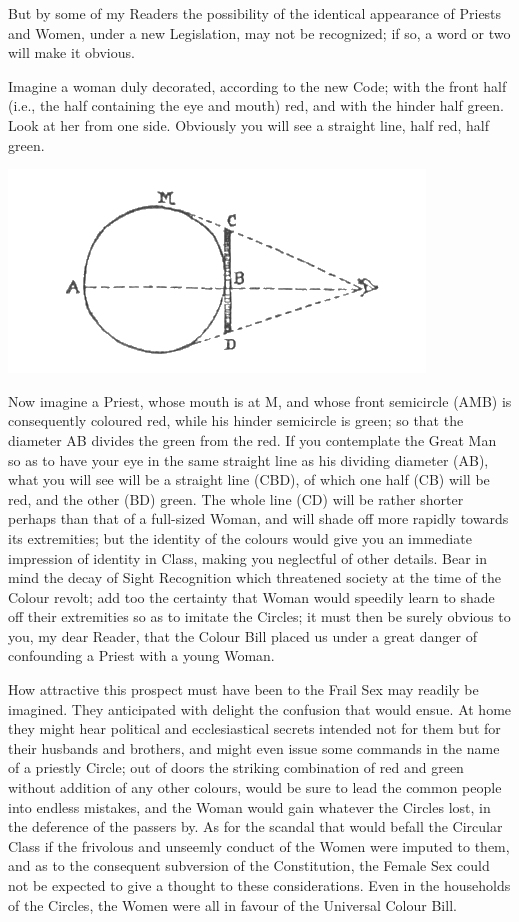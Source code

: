 \documentclass[12pt, a4paper, oneside]{memoir}
\begin{document}
But by some of my Readers the possibility of the identical appearance of
Priests and Women, under a new Legislation, may not be recognized; if so, a
word or two will make it obvious.

Imagine a woman duly decorated, according to the new Code; with the front half
(i.e., the half containing the eye and mouth) red, and with the hinder half
green. Look at her from one side. Obviously you will see a straight line, half
red, half green. 
\begin{center}
\includegraphics[trim=20mm 0mm 0mm 0mm, scale=0.5]{fig5}
\end{center}

Now imagine a Priest, whose mouth is at M, and whose front semicircle (AMB) is
consequently coloured red, while his hinder semicircle is green; so that the
diameter AB divides the green from the red. If you contemplate the Great Man
so as to have your eye in the same straight line as his dividing diameter
(AB), what you will see will be a straight line (CBD), of which one half (CB)
will be red, and the other (BD) green. The whole line (CD) will be rather
shorter perhaps than that of a full-sized Woman, and will shade off more
rapidly towards its extremities; but the identity of the colours would give
you an immediate impression of identity in Class, making you neglectful of
other details. Bear in mind the decay of Sight Recognition which threatened
society at the time of the Colour revolt; add too the certainty that Woman
would speedily learn to shade off their extremities so as to imitate the
Circles; it must then be surely obvious to you, my dear Reader, that the
Colour Bill placed us under a great danger of confounding a Priest with a
young Woman.

How attractive this prospect must have been to the Frail Sex may readily be
imagined. They anticipated with delight the confusion that would ensue. At
home they might hear political and ecclesiastical secrets intended not for
them but for their husbands and brothers, and might even issue some commands
in the name of a priestly Circle; out of doors the striking combination of red
and green without addition of any other colours, would be sure to lead the
common people into endless mistakes, and the Woman would gain whatever the
Circles lost, in the deference of the passers by. As for the scandal that
would befall the Circular Class if the frivolous and unseemly conduct of the
Women were imputed to them, and as to the consequent subversion of the
Constitution, the Female Sex could not be expected to give a thought to these
considerations. Even in the households of the Circles, the Women were all in
favour of the Universal Colour Bill.
\end{document}
